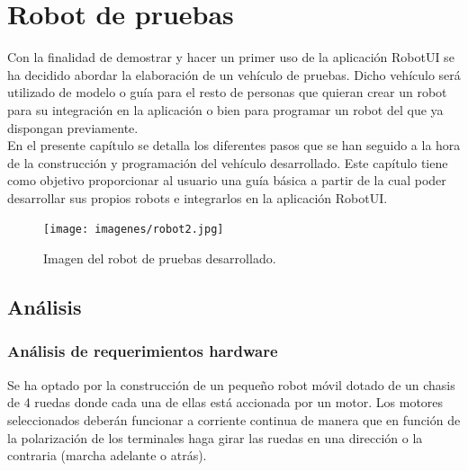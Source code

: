 

\newpage


\chapter{Robot de pruebas}

\label{chap:robot}

Con la finalidad de demostrar y hacer un primer uso de la aplicación RobotUI se ha decidido abordar la elaboración de un vehículo de pruebas. Dicho vehículo será utilizado de modelo o guía para el 
resto de personas que quieran crear un robot para su integración en la aplicación o bien para programar un robot del que ya dispongan previamente.\\

En el presente capítulo se detalla los diferentes pasos que se han seguido a la hora de la construcción y programación del vehículo desarrollado. Este capítulo tiene como objetivo proporcionar al usuario
una guía básica a partir de la cual poder desarrollar sus propios robots e integrarlos en la aplicación RobotUI.\\


\begin{figure}[H]
  \begin{center}
    \texttt{[image: imagenes/robot2.jpg]}
  \end{center}
  \caption{Imagen del robot de pruebas desarrollado.}
  \label{robot:robot02}
\end{figure}


\section{Análisis}
\label{sec:analisis}

\subsection{Análisis de requerimientos hardware}
\label{sec:requerimientos-hardware}

Se ha optado por la construcción de un  pequeño robot móvil dotado de un chasis de 4 ruedas donde cada una de ellas está accionada por un motor. Los motores seleccionados deberán funcionar a 
corriente continua de manera que en función de la polarización de los terminales haga girar las ruedas en una dirección o la contraria (marcha adelante o atrás).\\

